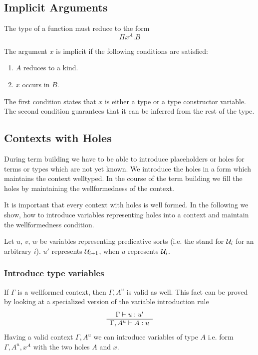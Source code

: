 \subsection{Implicit Arguments}


The type of a function must reduce to the form
$$
    \Pi x^A. B
$$

The argument $x$ is implicit if the following conditions are satisfied:

\begin{enumerate}

\item $A$ reduces to a kind.

\item $x$ occurs in $B$.
\end{enumerate}

The first condition states that $x$ is either a type or a type constructor
variable. The second condition guarantees that it can be inferred from the rest
of the type.








\subsection{Contexts with Holes}

During term building we have to be able to introduce placeholders or holes for
terms or types which are not yet known. We introduce the holes in a form which
maintains the context welltyped. In the course of the term building we fill the
holes by maintaining the wellformedness of the context.

It is important that every context with holes is well formed. In the following
we show, how to introduce variables representing holes into a context and
maintain the wellformedness condition.

Let $u$, $v$, $w$ be variables representing predicative sorts (i.e. the stand
for ${\cal{U}}_i$ for an arbitrary $i$). $u'$ represents ${\cal{U}}_{i+1}$, when $u$
represents ${\cal{U}}_i$.


\subsubsection{Introduce type variables}

If $\Gamma$ is a wellformed context, then $\Gamma, A^u$ is valid as well. This
fact can be proved by looking at a specialized version of the variable
introduction rule
%
$$
\begin{array}{c} \Gamma \vdash u: u' \\ \hline \Gamma, A^u \vdash A: u\end{array}
$$
%
Having a valid context $\Gamma,A^u$ we can introduce variables of type $A$ i.e.
form $\Gamma, A^u, x^A$ with the two holes $A$ and $x$.

